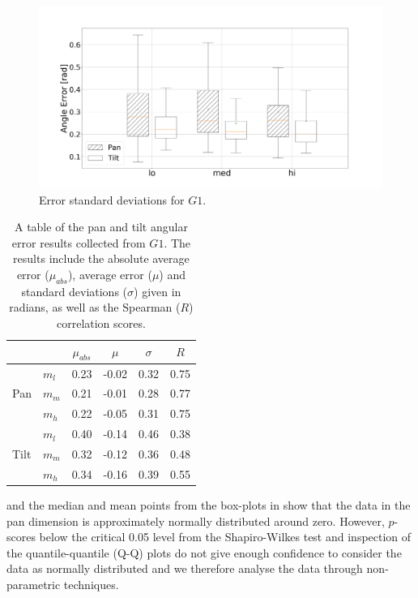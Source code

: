 \documentclass[sigconf, screen=true, anonymous=true]{acmart}
\begin{document}
\begin{figure}
  \centering
  \includegraphics[clip, trim=80 -70 100 0, width=0.8\columnwidth]{figures/err_boxplot_std.png}
  \caption{Error standard deviations for $G1$.}\label{fig:err-boxplot-std}
\end{figure}

\begin{table}
  \centering
  \caption{A table of the pan and tilt angular error results collected from $G1$. The results include the absolute average error ($\mu_{abs}$), average error ($\mu$) and standard deviations ($\sigma$) given in radians, as well as the Spearman ($R$) correlation scores.}\label{tab:results}
  \begin{tabular}{llcccc}
    \toprule
    \multicolumn{2}{c}{} & $\mu_{abs}$ & $\mu$ & $\sigma$ & $R$ \\\midrule
         & $m_l$ & 0.23 & -0.02 & 0.32 & 0.75 \\%
    Pan  & $m_m$ & 0.21 & -0.01 & 0.28 & 0.77 \\%
         & $m_h$ & 0.22 & -0.05 & 0.31 & 0.75 \\\midrule
         & $m_l$ & 0.40 & -0.14 & 0.46 & 0.38 \\%
    Tilt & $m_m$ & 0.32 & -0.12 & 0.36 & 0.48 \\%
         & $m_h$ & 0.34 & -0.16 & 0.39 & 0.55 \\
    \bottomrule
  \end{tabular}
\end{table}

 and the median and mean points from the box-plots in  show that the data in the pan dimension is approximately normally distributed around zero.
However, $p$-scores below the critical 0.05 level from the Shapiro-Wilkes test and inspection of the quantile-quantile (Q-Q) plots do not give enough confidence to consider the data as normally distributed and we therefore analyse the data through non-parametric techniques. 
\end{document}
